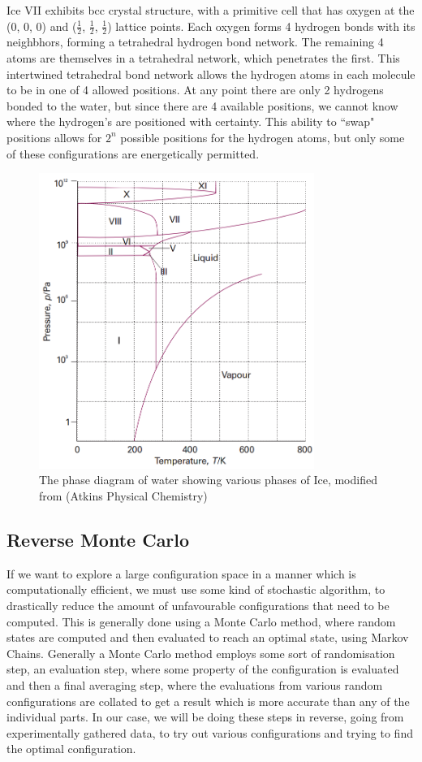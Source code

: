 \documentclass[a4paper,11pt]{article}
\begin{document}
Ice VII exhibits bcc crystal structure, with a primitive cell that has oxygen at the (0, 0, 0) and ($\frac{1}{2}$, $\frac{1}{2}$, $\frac{1}{2}$) lattice points. Each oxygen forms 4 hydrogen bonds with its neighbhors, forming a tetrahedral hydrogen bond network. The remaining 4 atoms are themselves in a tetrahedral network, which penetrates the first. This intertwined tetrahedral bond network allows the hydrogen atoms in each molecule to be in one of 4 allowed positions. At any point there are only 2 hydrogens bonded to the water, but since there are 4 available positions, we cannot know where the hydrogen's are positioned with certainty. This ability to ``swap" positions allows for $2^n$ possible positions for the hydrogen atoms, but only some of these configurations are energetically permitted.
\begin{figure}[H]
  \centering
  \includegraphics[width=0.8\textwidth]{images/phase-diagram.png}
  \caption{The phase diagram of water showing various phases of Ice, modified from (Atkins Physical Chemistry)}
  \label{fig:h2o-phasediag}
\end{figure}

\subsection{Reverse Monte Carlo}
If we want to explore a large configuration space in a manner which is computationally efficient, we must use some kind of stochastic algorithm, to drastically reduce the amount of unfavourable configurations that need to be computed. This is generally done using a Monte Carlo method, where random states are computed and then evaluated to reach an optimal state, using Markov Chains. Generally a Monte Carlo method employs some sort of randomisation step, an evaluation step, where some property of the configuration is evaluated and then a final averaging step, where the evaluations from various random configurations are collated to get a result which is more accurate than any of the individual parts. In our case, we will be doing these steps in reverse, going from experimentally gathered data, to try out various configurations and trying to find the optimal configuration.
\end{document}
